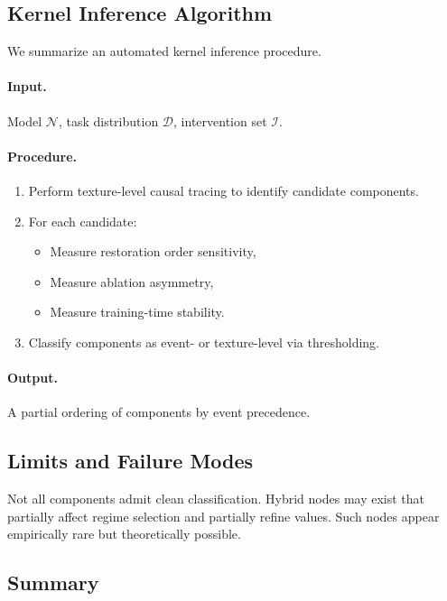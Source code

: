 \documentclass[11pt]{article}
\theoremstyle{remark}
\newcommand{\NN}{\mathcal{N}}
\begin{document}
\subsection{Kernel Inference Algorithm}

We summarize an automated kernel inference procedure.

\paragraph{Input.}
Model $\NN$, task distribution $\mathcal{D}$, intervention set
$\mathcal{I}$.

\paragraph{Procedure.}
\begin{enumerate}
\item Perform texture-level causal tracing to identify candidate
components.
\item For each candidate:
  \begin{itemize}
  \item Measure restoration order sensitivity,
  \item Measure ablation asymmetry,
  \item Measure training-time stability.
  \end{itemize}
\item Classify components as event- or texture-level via thresholding.
\end{enumerate}

\paragraph{Output.}
A partial ordering of components by event precedence.

\subsection{Limits and Failure Modes}

Not all components admit clean classification. Hybrid nodes may exist
that partially affect regime selection and partially refine values.
Such nodes appear empirically rare but theoretically possible.

\subsection{Summary}
\end{document}
